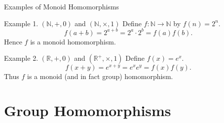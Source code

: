 \documentclass[11pt,aspectratio=43,ignorenonframetext,t]{beamer}
\begin{document}
\begin{frame}{Examples of Monoid Homomorphisms}
\begin{block}{Example 1.} $(\mathbb{N}, +, 0)$ and $(\mathbb{N}, \times, 1)$  
Define \( f: \mathbb{N} \to \mathbb{N} \) by \( f(n) = 2^n. \)
\[
f(a+b) = 2^{a+b} = 2^a \cdot 2^b = f(a)f(b).
\]
Hence \(f\) is a monoid homomorphism.
\end{block} 
\begin{block}{Example 2.} $(\mathbb{R}, +, 0)$ and $(\mathbb{R}^+, \times, 1)$  
Define \( f(x) = e^x \).  
\[
f(x+y) = e^{x+y} = e^x e^y = f(x)f(y).
\]
Thus \(f\) is a monoid (and in fact group) homomorphism.
\end{block}  
\end{frame}

\section{Group Homomorphisms}
\end{document}
